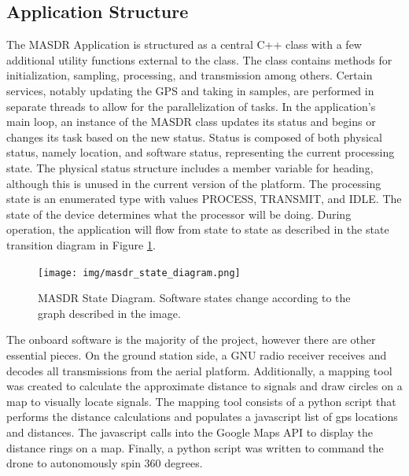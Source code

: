 \subsection{Application Structure} 
The MASDR Application is structured as a central C++ class with a few additional utility functions external to the class. The class contains methods for initialization, sampling, processing, and transmission among others. Certain services, notably updating the GPS and taking in samples, are performed in separate threads to allow for the parallelization of tasks. In the application’s main loop, an instance of the MASDR class updates its status and begins or changes its task based on the new status. Status is composed of both physical status, namely location, and software status, representing the current processing state. The physical status structure includes a member variable for heading, although this is unused in the current version of the platform. The processing state is an enumerated type with values PROCESS, TRANSMIT, and IDLE. The state of the device determines what the processor will be doing. During operation, the application will flow from state to state as described in the state transition diagram in Figure \ref{fig:state_diagram}. \par
\begin{figure}[ht]
\centering
\texttt{[image: img/masdr\_state\_diagram.png]}
\caption{MASDR State Diagram. Software states change according to the graph described in the image.}
\label{fig:state_diagram}
\end{figure}
The onboard software is the majority of the project, however there are other essential pieces. On the ground station side, a GNU radio receiver receives and decodes all transmissions from the aerial platform. Additionally, a mapping tool was created to calculate the approximate distance to signals and draw circles on a map to visually locate signals. The mapping tool consists of a python script that performs the distance calculations and populates a javascript list of gps locations and distances. The javascript calls into the Google Maps API to display the distance rings on a map. Finally, a python script was written to command the drone to autonomously spin 360 degrees.
